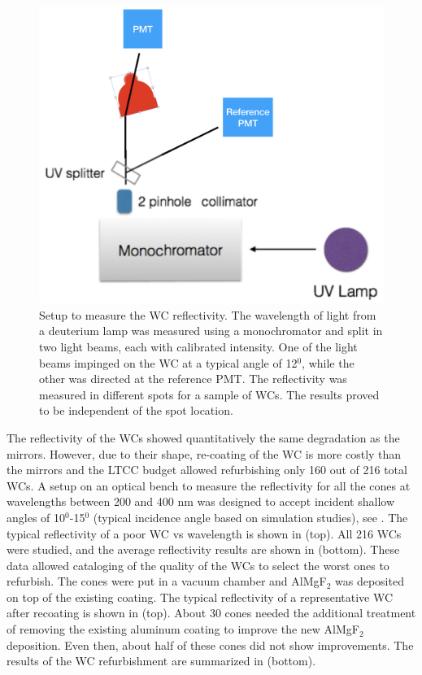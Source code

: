 \begin{figure}
	\centering
	\includegraphics[width=0.98\columnwidth,keepaspectratio]{img/wcSetup.png}
	\caption{Setup to measure the WC reflectivity. The wavelength of light from a deuterium lamp was measured using a monochromator and split in two
            light beams, each with calibrated intensity. One of the light beams impinged on the WC at a typical angle of 12$^0$,
            while the other was directed at the reference PMT. The reflectivity was measured in different spots for a sample of WCs.  The results proved
            to be independent of the spot location. }
	\label{fig:wcSetup}
\end{figure}

The reflectivity of the WCs showed quantitatively the same degradation as the mirrors. However, due to their shape, re-coating of the WC is more costly
than the mirrors and the LTCC budget allowed refurbishing only 160 out of 216 total WCs.
A setup on an optical bench to measure the reflectivity for all the cones at wavelengths between 200 and 400 nm was designed to
accept incident shallow angles of 10$^0$-15$^0$ (typical incidence angle based on simulation studies), see .
The typical reflectivity of a poor WC vs wavelength is shown in  (top).
All 216 WCs were studied, and the average reflectivity results are shown in  (bottom).
These data allowed cataloging of the quality of the WCs to select the worst ones to refurbish.
The cones were put in a vacuum chamber and AlMgF$_2$ was deposited on top of the existing coating.
The typical reflectivity of a representative WC after recoating is shown in  (top).
About 30 cones needed the additional treatment of removing the existing aluminum coating to improve the new AlMgF$_2$ deposition.
Even then, about half of these cones did not show improvements.
The results of the WC refurbishment are summarized in  (bottom).


